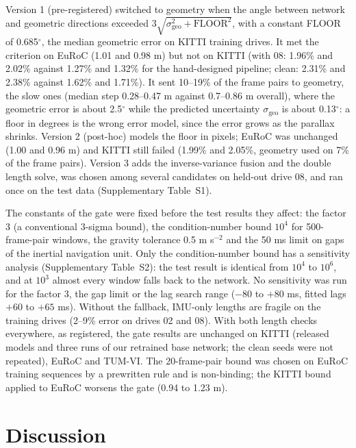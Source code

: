 \documentclass[pdflatex,sn-nature]{sn-jnl}
\begin{document}
Version 1 (pre-registered) switched to geometry when the angle between network and geometric directions exceeded $3\sqrt{\sigma_\mathrm{geo}^2+\mathrm{FLOOR}^2}$, with a constant FLOOR of 0.685$^\circ$, the median geometric error on KITTI training drives. It met the criterion on EuRoC (1.01 and 0.98 m) but not on KITTI (with 08: 1.96\% and 2.02\% against 1.27\% and 1.32\% for the hand-designed pipeline; clean: 2.31\% and 2.38\% against 1.62\% and 1.71\%). It sent 10--19\% of the frame pairs to geometry, the slow ones (median step 0.28--0.47 m against 0.7--0.86 m overall), where the geometric error is about 2.5$^\circ$ while the predicted uncertainty $\sigma_\mathrm{geo}$ is about 0.13$^\circ$: a floor in degrees is the wrong error model, since the error grows as the parallax shrinks. Version 2 (post-hoc) models the floor in pixels; EuRoC was unchanged (1.00 and 0.96 m) and KITTI still failed (1.99\% and 2.05\%, geometry used on 7\% of the frame pairs). Version 3 adds the inverse-variance fusion and the double length solve, was chosen among several candidates on held-out drive 08, and ran once on the test data (Supplementary Table~S1).

The constants of the gate were fixed before the test results they affect: the factor 3 (a conventional 3-sigma bound), the condition-number bound $10^4$ for 500-frame-pair windows, the gravity tolerance 0.5 m s$^{-2}$ and the 50 ms limit on gaps of the inertial navigation unit. Only the condition-number bound has a sensitivity analysis (Supplementary Table~S2): the test result is identical from $10^4$ to $10^6$, and at $10^3$ almost every window falls back to the network. No sensitivity was run for the factor 3, the gap limit or the lag search range ($-80$ to $+80$ ms, fitted lags $+60$ to $+65$ ms). Without the fallback, IMU-only lengths are fragile on the training drives (2--9\% error on drives 02 and 08). With both length checks everywhere, as registered, the gate results are unchanged on KITTI (released models and three runs of our retrained base network; the clean seeds were not repeated), EuRoC and TUM-VI. The 20-frame-pair bound was chosen on EuRoC training sequences by a prewritten rule and is non-binding; the KITTI bound applied to EuRoC worsens the gate (0.94 to 1.23 m).

\section{Discussion}\label{sec:discussion}
\end{document}
